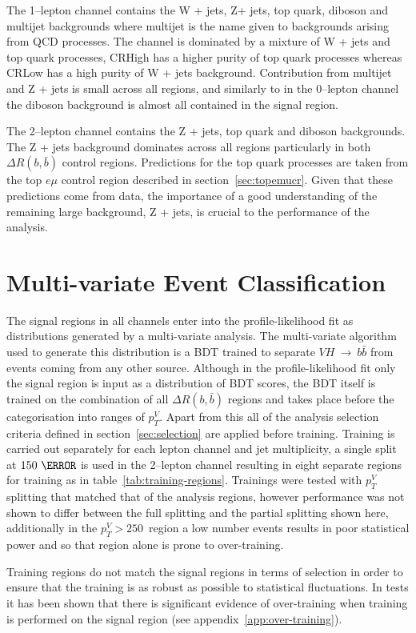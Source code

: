 The 1--lepton channel contains the W + jets, Z+ jets, top quark, diboson and multijet
backgrounds where multijet is the name given to backgrounds arising from QCD
processes. The channel is dominated by a mixture of W + jets and top quark
processes, CRHigh has a higher purity of top quark processes whereas CRLow has a
high purity of W + jets background. Contribution from multijet and Z + jets is
small across all regions, and similarly to in the 0--lepton channel the diboson
background is almost all contained in the signal region.

The 2--lepton channel contains the Z + jets, top quark and diboson backgrounds.
The Z + jets background dominates across all regions particularly in both
$\Delta R(b, \bar{b})$ control regions. Predictions for the top quark processes
are taken from the top $e \mu$ control region described in
section~\ref{sec:topemucr}. Given that these predictions come from data, the
importance of a good understanding of the remaining large background, Z + jets,
is crucial to the performance of the analysis.

\section{Multi-variate Event Classification}%
\label{sec:mva}

The signal regions in all channels enter into the profile-likelihood fit as
distributions generated by a multi-variate analysis. The multi-variate algorithm
used to generate this distribution is a BDT trained to separate
$VH~\rightarrow~b\bar{b}$ from events coming from any other source. Although in
the profile-likelihood fit only the signal region is input as a distribution of
BDT scores, the BDT itself is trained on the combination of all $\Delta R(b,
\bar{b})$ regions and takes place before the categorisation into ranges of
$p_T^V$. Apart from this all of the analysis selection criteria defined in
section~\ref{sec:selection} are applied before training. Training is carried out
separately for each lepton channel and jet multiplicity, a single split at
$150~\GeV$ is used in the 2--lepton channel resulting in eight separate regions
for training as in table~\ref{tab:training-regions}. Trainings were tested with
$p_T^V$ splitting that matched that of the analysis regions, however performance
was not shown to differ between the full splitting and the partial splitting
shown here, additionally in the $p_T^V > 250$~\GeV region a low number events
results in poor statistical power and so that region alone is prone to
over-training.

Training regions do not match the signal regions in terms of selection in order
to ensure that the training is as robust as possible to statistical
fluctuations. In tests it has been shown that there is significant evidence of
over-training when training is performed on the signal region (see
appendix~\ref{app:over-training}).

